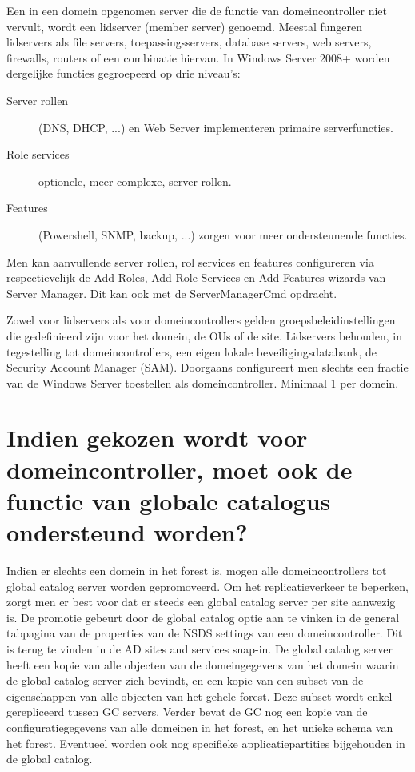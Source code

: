Een in een domein opgenomen server die de functie van domeincontroller niet
vervult, wordt een lidserver (member server) genoemd. Meestal fungeren
lidservers als file servers, toepassingsservers, database servers, web servers,
firewalls, routers of een combinatie hiervan. In Windows Server 2008+ worden
dergelijke functies gegroepeerd op drie niveau's:
\begin{description}
	\item[Server rollen] (DNS, DHCP, ...) en Web Server implementeren
		primaire serverfuncties.
	\item[Role services] optionele, meer complexe, server rollen.
	\item[Features] (Powershell, SNMP, backup, ...) zorgen voor meer
		ondersteunende functies.
\end{description}
Men kan aanvullende server rollen, rol services en features configureren via
respectievelijk de Add Roles, Add Role Services en Add Features wizards van
Server Manager. Dit kan ook met de ServerManagerCmd opdracht.

Zowel voor lidservers als voor domeincontrollers gelden groepsbeleidinstellingen
die gedefinieerd zijn voor het domein, de OUs of de site. Lidservers behouden, in
tegestelling tot domeincontrollers, een eigen lokale beveiligingsdatabank, de
Security Account Manager (SAM).
Doorgaans configureert men slechts een fractie van de Windows Server toestellen
als domeincontroller. Minimaal 1 per domein.

\section{Indien gekozen wordt voor domeincontroller, moet ook de functie van
globale catalogus ondersteund worden?}

Indien er slechts een domein in het forest is, mogen alle domeincontrollers tot
global catalog server worden gepromoveerd. Om het replicatieverkeer te beperken,
zorgt men er best voor dat er steeds een global catalog server per site aanwezig
is. De promotie gebeurt door de global catalog optie aan te vinken in de general
tabpagina van de properties van de NSDS settings van een domeincontroller. Dit
is terug te vinden in de AD sites and services snap-in. De global catalog server
heeft een kopie van alle objecten van de domeingegevens van het domein waarin de
global catalog server zich bevindt, en een kopie van een subset van de
eigenschappen van alle objecten van het gehele forest. Deze subset wordt enkel
gerepliceerd tussen GC servers. Verder bevat de GC nog een kopie van de
configuratiegegevens van alle domeinen in het forest, en het unieke schema van
het forest. Eventueel worden ook nog specifieke applicatiepartities bijgehouden
in de global catalog.

